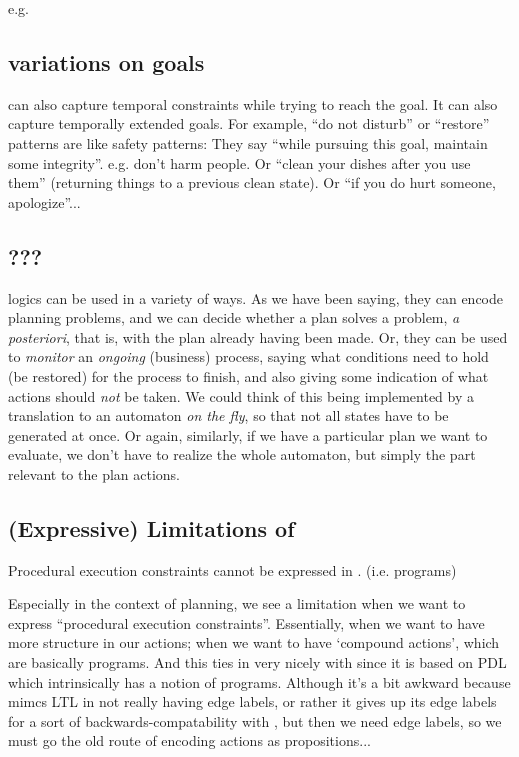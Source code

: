 e.g.

\subsection{variations on goals}
\ltlf can also capture temporal constraints while trying to reach the goal.
It can also capture temporally extended goals.
For example, ``do not disturb'' or ``restore'' patterns are like safety patterns:
They say ``while pursuing this goal, maintain some integrity''. e.g. don't harm people.
Or ``clean your dishes after you use them'' (returning things to a previous clean state).
Or ``if you do hurt someone, apologize''...

\subsection{???}
logics can be used in a variety of ways. As we have been saying,
they can encode planning problems, and
we can decide whether a plan solves a problem, \emph{a posteriori}, that is,
with the plan already having been made.
Or, they can be used to \emph{monitor} an \emph{ongoing} (business) process, saying
what conditions need to hold (be restored) for the process to finish, and also
giving some indication of what actions should \emph{not} be taken.
We could think of this being implemented by a translation to an automaton \emph{on the fly},
so that not all states have to be generated at once.
Or again, similarly, if we have a particular plan we want to evaluate, we don't have to
realize the whole automaton, but simply the part relevant to the plan actions.

\subsection{(Expressive) Limitations of \ltlf}
Procedural execution constraints cannot be expressed in \ltlf.
\cite{ldlfsynth} (i.e. programs)

Especially in the context of planning, we see a limitation when we want to express
``procedural execution constraints''. Essentially, when we want to have more structure in our actions;
when we want to have `compound actions', which are basically programs.
And this ties in very nicely with \ldlf since it is based on PDL which intrinsically has a notion of programs.
Although it's a bit awkward because \ldlf mimcs LTL in not really having edge labels, or rather it
gives up its edge labels for a sort of backwards-compatability with \ltlf, but then we need edge labels, so
we must go the old route of encoding actions as propositions...

